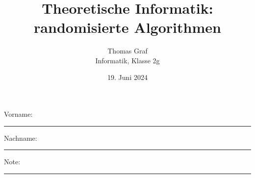 \newtoggle{withbonus}  %
\lstset{style=Python}

\newcommand{\mycourse}{Informatik}
\newcommand{\myclass}{Klasse 2g}
\newcommand{\mydate}{19. Juni 2024}

\title{\textbf{Theoretische Informatik: randomisierte Algorithmen}}
\author{Thomas Graf\\
\mycourse, \myclass}
\date{\mydate}
\maketitle
\thispagestyle{headandfoot}		

\begin{center}
\end{center}
\vspace{10mm}

\begin{center}
	Vorname: \rule{45mm}{0.8pt}\qquad Nachname: \rule{45mm}{0.8pt}
\end{center}
\vspace{20mm}

\begin{center}
	\iftoggle{withbonus} {
		\combinedgradetable[h][questions]
	} {
		\gradetable[h][questions]
	}
\end{center}
\vspace{15mm}
\begin{center}
	Note: 
	\vspace{10mm}
	
	\rule{8mm}{1.2pt}
\end{center}
\clearpage


